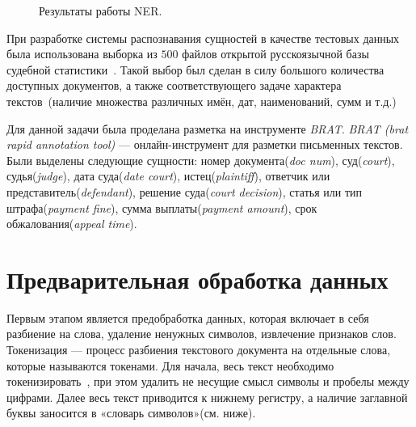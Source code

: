 \documentclass{csmathnotes}
\begin{document}
\begin{figure}[h]
	\caption{Результаты работы NER.}
	\label{fig:ner}
\end{figure}


При разработке системы распознавания сущностей в качестве тестовых данных была использована выборка из $500$ файлов открытой русскоязычной базы судебной статистики~\cite{CourtsData}. Такой выбор был сделан в силу большого количества доступных документов, а также соответствующего задаче характера текстов~(наличие множества различных имён, дат, наименований, сумм и т.д.)

Для данной задачи была проделана разметка на инструменте \emph{BRAT}. \emph{BRAT (brat rapid annotation tool)} — онлайн-инструмент для разметки письменных текстов. Были выделены следующие сущности: номер документа(\emph{doc num}), суд(\emph{court}), судья(\emph{judge}), дата суда(\emph{date court}), истец(\emph{plaintiff}), ответчик или представитель(\emph{defendant}), решение суда(\emph{court decision}), статья или тип штрафа(\emph{payment fine}), сумма выплаты(\emph{payment amount}), срок обжалования(\emph{appeal time}).


\section*{Предварительная обработка данных}
Первым этапом является предобработка данных, которая включает в себя разбиение на слова, удаление ненужных символов, извлечение признаков слов. 
Токенизация — процесс разбиения текстового документа на отдельные слова, которые называются токенами. Для начала, весь текст необходимо токенизировать~\cite{Ner}, при этом удалить не несущие смысл символы и пробелы между цифрами. Далее весь текст приводится к нижнему регистру, а наличие заглавной буквы заносится в «словарь символов»(см. ниже).
\end{document}
